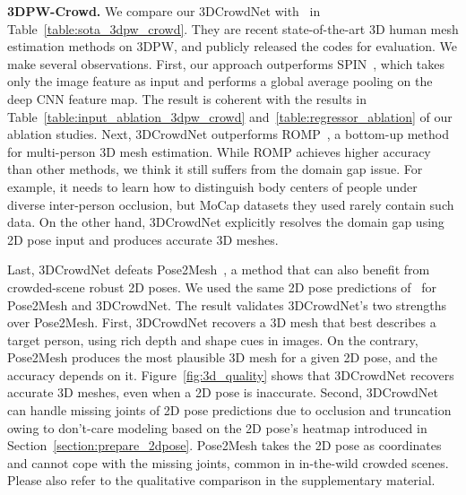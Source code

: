 \documentclass[10pt,twocolumn,letterpaper]{article}
\begin{document}
\noindent\textbf{3DPW-Crowd.}
We compare our 3DCrowdNet with~\cite{kolotouros2019learning,choi2020p2m,moon2020i2l,sun2021monocular} in Table~\ref{table:sota_3dpw_crowd}.
They are recent state-of-the-art 3D human mesh estimation methods on 3DPW, and publicly released the codes for evaluation.
We make several observations.
First, our approach outperforms SPIN~\cite{kolotouros2019learning}, which takes only the image feature as input and performs a global average pooling on the deep CNN feature map.
The result is coherent with the results in Table~\ref{table:input_ablation_3dpw_crowd} and~\ref{table:regressor_ablation} of our ablation studies.
Next, 3DCrowdNet outperforms ROMP~\cite{sun2021monocular}, a bottom-up method for multi-person 3D mesh estimation.
While ROMP achieves higher accuracy than other methods, we think it still suffers from the domain gap issue.
For example, it needs to learn how to distinguish body centers of people under diverse inter-person occlusion, but MoCap datasets they used rarely contain such data.
On the other hand, 3DCrowdNet explicitly resolves the domain gap using 2D pose input and produces accurate 3D meshes.

Last, 3DCrowdNet defeats Pose2Mesh~\cite{choi2020p2m}, a method that can also benefit from crowded-scene robust 2D poses.
We used the same 2D pose predictions of~\cite{cheng2020higherhrnet} for Pose2Mesh and 3DCrowdNet.
The result validates 3DCrowdNet's two strengths over Pose2Mesh.
First, 3DCrowdNet recovers a 3D mesh that best describes a target person, using rich depth and shape cues in images.
On the contrary, Pose2Mesh produces the most plausible 3D mesh for a given 2D pose, and the accuracy depends on it.
Figure~\ref{fig:3d_quality} shows that 3DCrowdNet recovers accurate 3D meshes, even when a 2D pose is inaccurate.
Second, 3DCrowdNet can handle missing joints of 2D pose predictions due to occlusion and truncation owing to don't-care modeling based on the 2D pose's heatmap introduced in Section~\ref{section:prepare_2dpose}.
Pose2Mesh takes the 2D pose as coordinates and cannot cope with the missing joints, common in in-the-wild crowded scenes.
Please also refer to the qualitative comparison in the supplementary material.
\end{document}

